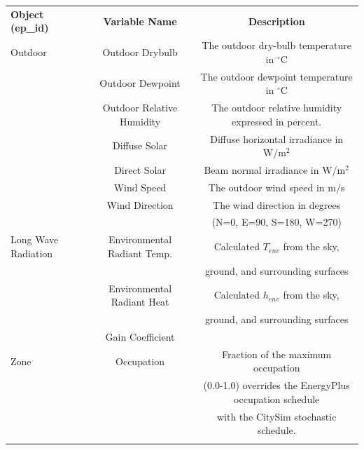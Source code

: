 \documentclass{tBPS2e}
\theoremstyle{plain}
\theoremstyle{definition}
\theoremstyle{remark}
\begin{document}
\begin{table}
{\begin{tabular}[l]{@{}lcc}\toprule
  \bf{Object (ep\_id)} &  \bf{Variable Name} & \bf{Description} \\
\colrule
  Outdoor & Outdoor Drybulb & The outdoor dry-bulb temperature in $^{\circ}\mathrm{C}$ \\
 & Outdoor Dewpoint & The outdoor dewpoint temperature in $^{\circ}\mathrm{C}$ \\
 & Outdoor Relative Humidity & The outdoor relative humidity expressed in percent. \\
 & Diffuse Solar & Diffuse horizontal irradiance in W/m$^2$ \\
 & Direct Solar & Beam normal irradiance in W/m$^2$ \\
 & Wind Speed & The outdoor wind speed in m/s \\
 & Wind Direction & The wind direction in degrees\\&&  (N=0, E=90, S=180, W=270) \\
 \hline
 Long Wave Radiation & Environmental Radiant Temp. & Calculated $T_{env}$ from the sky,\\&& ground, and surrounding surfaces \\
 & Environmental Radiant Heat & Calculated $h_{env}$ from the sky,\\&& ground, and surrounding surfaces \\
 & Gain Coefficient \\
 \hline
Zone & Occupation & Fraction of the maximum occupation\\&& (0.0-1.0) overrides the EnergyPlus occupation schedule\\&&  with the CitySim stochastic schedule. \\
\botrule
\end{tabular}}
\label{FMUimports}
\end{table}
\end{document}
